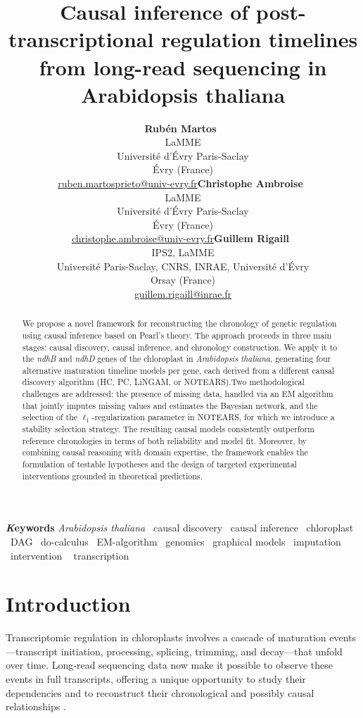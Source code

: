 \documentclass[
]{article}
\title{Causal inference of post-transcriptional regulation timelines
from long-read sequencing in Arabidopsis thaliana}
\author{\textbf{Rubén
Martos}~\orcidlink{https://orcid.org/0000-0002-1463-5088}\\LaMME\\Université
d'Évry
Paris-Saclay\\Évry  (France)\\\href{mailto:ruben.martosprieto@univ-evry.fr}{ruben.martosprieto@univ-evry.fr}\asep\textbf{Christophe
Ambroise}~\orcidlink{https://orcid.org/0000-0002-8148-0346}\\LaMME\\Université
d'Évry
Paris-Saclay\\Évry  (France)\\\href{mailto:christophe.ambroise@univ-evry.fr}{christophe.ambroise@univ-evry.fr}\asep\textbf{Guillem
Rigaill}~\orcidlink{https://orcid.org/0000-0002-7176-7511}\\IPS2,
LaMME\\Université Paris-Saclay, CNRS, INRAE, Université
d'Évry\\Orsay  (France)\\\href{mailto:guillem.rigaill@inrae.fr}{guillem.rigaill@inrae.fr}}
\date{}
\renewcommand*\contentsname{Table of contents}
\newcommand\contentsname{Table of contents}
\theoremstyle{definition}
\theoremstyle{remark}
\begin{document}
\maketitle
\begin{abstract}
We propose a novel framework for reconstructing the chronology of
genetic regulation using causal inference based on Pearl's theory. The
approach proceeds in three main stages: causal discovery, causal
inference, and chronology construction. We apply it to the \emph{ndhB}
and \emph{ndhD} genes of the chloroplast in \emph{Arabidopsis thaliana},
generating four alternative maturation timeline models per gene, each
derived from a different causal discovery algorithm (HC, PC, LiNGAM, or
NOTEARS).Two methodological challenges are addressed: the presence of
missing data, handled via an EM algorithm that jointly imputes missing
values and estimates the Bayesian network, and the selection of the
\(\ell_1\)-regularization parameter in NOTEARS, for which we introduce a
stability selection strategy. The resulting causal models consistently
outperform reference chronologies in terms of both reliability and model
fit. Moreover, by combining causal reasoning with domain expertise, the
framework enables the formulation of testable hypotheses and the design
of targeted experimental interventions grounded in theoretical
predictions.
\end{abstract}
{\bfseries \emph Keywords}
\def\sep{\textbullet\ }
\emph{Arabidopsis thaliana} \sep causal discovery \sep causal
inference \sep chloroplast \sep DAG \sep do-calculus \sep EM-algorithm \sep genomics \sep graphical
models \sep imputation \sep intervention \sep 
transcription


\renewcommand*\contentsname{Table of contents}
{
\hypersetup{linkcolor=}
\setcounter{tocdepth}{2}
\tableofcontents
}

\newpage{}

\section{Introduction}\label{sec-intro}

Transcriptomic regulation in chloroplasts involves a cascade of
maturation events---transcript initiation, processing, splicing,
trimming, and decay---that unfold over time. Long‑read sequencing data
now make it possible to observe these events in full transcripts,
offering a unique opportunity to study their dependencies and to
reconstruct their chronological and possibly causal relationships
.
\end{document}
